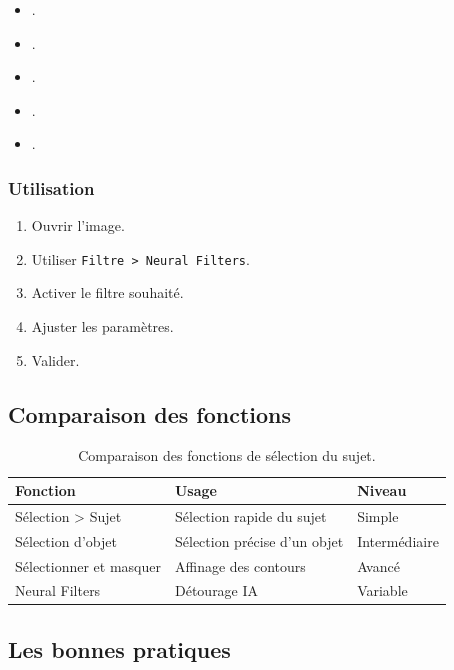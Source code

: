 \begin{itemize}
    \item {}.
    \item {}.
    \item {}.
    \item {}.
    \item {}.
\end{itemize}

\subsubsection{Utilisation}

\begin{enumerate}
    \item Ouvrir l'image.
    \item Utiliser \texttt{Filtre > Neural Filters}.
    \item Activer le filtre souhaité.
    \item Ajuster les paramètres.
    \item Valider.
\end{enumerate}

\subsection{Comparaison des fonctions}

\begin{table}[h!]
\centering
\begin{tabular}{@{}p{3.5cm}p{5cm}p{4.5cm}@{}}
\toprule
\textbf{Fonction} & \textbf{Usage} & \textbf{Niveau} \\
\midrule
Sélection > Sujet & Sélection rapide du sujet & Simple \\
Sélection d'objet & Sélection précise d'un objet & Intermédiaire \\
Sélectionner et masquer & Affinage des contours & Avancé \\
Neural Filters & Détourage IA & Variable \\
\bottomrule
\end{tabular}
\caption{Comparaison des fonctions de sélection du sujet.}
\end{table}

\subsection{Les bonnes pratiques}

